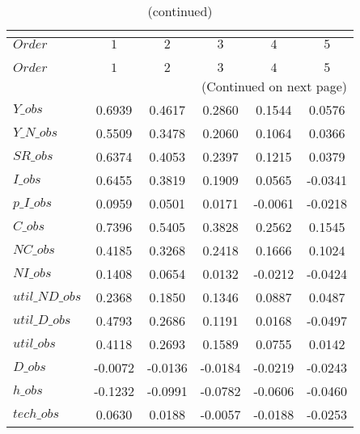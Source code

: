  
\begin{center}
\begin{longtable}{lccccc} 
\caption{COEFFICIENTS OF AUTOCORRELATION}\\
 \label{Table:th_autocorr_matrix}\\
\toprule 
$Order          $	 & 	 $          1$	 & 	 $          2$	 & 	 $          3$	 & 	 $          4$	 & 	 $          5$\\
\midrule \endfirsthead 
\caption{(continued)}\\
 \toprule \\ 
$Order          $	 & 	 $          1$	 & 	 $          2$	 & 	 $          3$	 & 	 $          4$	 & 	 $          5$\\
\midrule \endhead 
\midrule \multicolumn{6}{r}{(Continued on next page)} \\ \bottomrule \endfoot 
\bottomrule \endlastfoot 
$Y\_obs         $	 & 	     0.6939	 & 	     0.4617	 & 	     0.2860	 & 	     0.1544	 & 	     0.0576 \\ 
$Y\_N\_obs      $	 & 	     0.5509	 & 	     0.3478	 & 	     0.2060	 & 	     0.1064	 & 	     0.0366 \\ 
$SR\_obs        $	 & 	     0.6374	 & 	     0.4053	 & 	     0.2397	 & 	     0.1215	 & 	     0.0379 \\ 
$I\_obs         $	 & 	     0.6455	 & 	     0.3819	 & 	     0.1909	 & 	     0.0565	 & 	    -0.0341 \\ 
$p\_I\_obs      $	 & 	     0.0959	 & 	     0.0501	 & 	     0.0171	 & 	    -0.0061	 & 	    -0.0218 \\ 
$C\_obs         $	 & 	     0.7396	 & 	     0.5405	 & 	     0.3828	 & 	     0.2562	 & 	     0.1545 \\ 
$NC\_obs        $	 & 	     0.4185	 & 	     0.3268	 & 	     0.2418	 & 	     0.1666	 & 	     0.1024 \\ 
$NI\_obs        $	 & 	     0.1408	 & 	     0.0654	 & 	     0.0132	 & 	    -0.0212	 & 	    -0.0424 \\ 
$util\_ND\_obs  $	 & 	     0.2368	 & 	     0.1850	 & 	     0.1346	 & 	     0.0887	 & 	     0.0487 \\ 
$util\_D\_obs   $	 & 	     0.4793	 & 	     0.2686	 & 	     0.1191	 & 	     0.0168	 & 	    -0.0497 \\ 
$util\_obs      $	 & 	     0.4118	 & 	     0.2693	 & 	     0.1589	 & 	     0.0755	 & 	     0.0142 \\ 
$D\_obs         $	 & 	    -0.0072	 & 	    -0.0136	 & 	    -0.0184	 & 	    -0.0219	 & 	    -0.0243 \\ 
$h\_obs         $	 & 	    -0.1232	 & 	    -0.0991	 & 	    -0.0782	 & 	    -0.0606	 & 	    -0.0460 \\ 
$tech\_obs      $	 & 	     0.0630	 & 	     0.0188	 & 	    -0.0057	 & 	    -0.0188	 & 	    -0.0253 \\ 
\end{longtable}
 \end{center}
